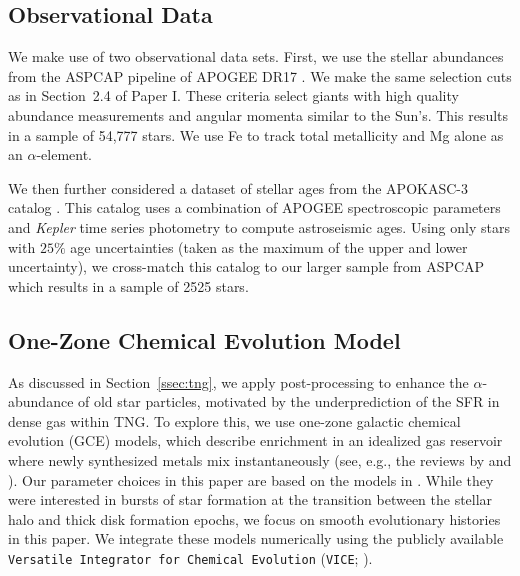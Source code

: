 \documentclass[twocolumn]{aastex631}
\begin{document}
\subsection{Observational Data}\label{ssec:obs}
We make use of two observational data sets. First, we use the stellar abundances from the ASPCAP pipeline of APOGEE DR17 \citep[][J.A.~Holtzman et al., in preparation]{2016AJ....151..144G,2017AJ....154...28B,2017AJ....154...94M,2022ApJS..259...35A}. We make the same selection cuts as in Section~2.4 of Paper I. These criteria select giants with high quality abundance measurements and angular momenta similar to the Sun's. This results in a sample of 54,777 stars. We use Fe to track total metallicity and Mg alone as an $\alpha$-element.

We then further considered a dataset of stellar ages from the APOKASC-3 catalog \citep{2024arXiv241000102P}. This catalog uses a combination of APOGEE spectroscopic parameters and \textit{Kepler} time series photometry to compute astroseismic ages. Using only stars with $25\%$ age uncertainties (taken as the maximum of the upper and lower uncertainty), we cross-match this catalog to our larger sample from ASPCAP which results in a sample of 2525 stars.

\subsection{One-Zone Chemical Evolution Model}\label{ssec:onezone_met}
As discussed in Section~\ref{ssec:tng}, we apply post-processing to enhance the $\alpha$-abundance of old star particles, motivated by the underprediction of the SFR in dense gas within TNG. To explore this, we use one-zone galactic chemical evolution (GCE) models, which describe enrichment in an idealized gas reservoir where newly synthesized metals mix instantaneously (see, e.g., the reviews by \citealt{Tinsley1980} and \citealt{Matteucci2021}). Our parameter choices in this paper are based on the models in \citet{2022arXiv220402989C}. While they were interested in bursts of star formation at the transition between the stellar halo and thick disk formation epochs, we focus on smooth evolutionary histories in this paper. We integrate these models numerically using the publicly available {\tt Versatile Integrator for Chemical Evolution} ({\tt VICE}; \citealt{2020MNRAS.498.1364J}).
\end{document}
